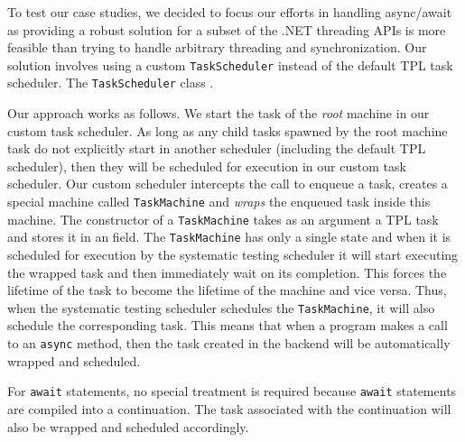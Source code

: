 To test our case studies, we decided to focus our efforts in handling async/await as providing a robust solution for a subset of the .NET threading APIs is more feasible than trying to handle arbitrary threading and synchronization. Our solution involves using a custom \texttt{TaskScheduler} instead of the default TPL task scheduler. The \texttt{TaskScheduler} class .

Our approach works as follows. We start the task of the \emph{root} \psharp machine in our custom task scheduler. As long as any child tasks spawned by the root machine task do not explicitly start in another scheduler (including the default TPL scheduler), then they will be scheduled for execution in our custom task scheduler. Our custom scheduler intercepts the call to enqueue a task, creates a special machine called \texttt{TaskMachine} and \emph{wraps} the enqueued task inside this machine. The constructor of a \texttt{TaskMachine} takes as an argument a TPL task and stores it in an field. The \texttt{TaskMachine} has only a single state and when it is scheduled for execution by the \psharp systematic testing scheduler it will start executing the wrapped task and then immediately wait on its completion. This forces the lifetime of the task to become the lifetime of the machine and vice versa. Thus, when the \psharp systematic testing scheduler schedules the \texttt{TaskMachine}, it will also schedule the corresponding task. This means that when a \psharp program makes a call to an \texttt{async} method, then the task created in the backend will be automatically wrapped and scheduled.

For \texttt{await} statements, no special treatment is required because \texttt{await} statements are compiled into a continuation. The task associated with the continuation will also be wrapped and scheduled accordingly.
